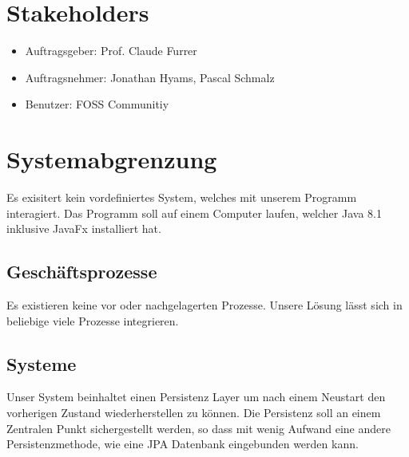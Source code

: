 \documentclass[11pt,titelpage]{scrartcl}
\begin{document}
\section{Stakeholders}
\begin{itemize}
\item{Auftragsgeber: Prof. Claude Furrer}
\item{Auftragsnehmer: Jonathan Hyams, Pascal Schmalz}
\item{Benutzer: FOSS Communitiy}
\end{itemize}
\section {Systemabgrenzung}
Es exisitert kein vordefiniertes System, welches mit unserem Programm interagiert.
Das Programm soll auf einem Computer laufen, welcher Java 8.1 inklusive JavaFx installiert hat.
 
\subsection{Geschäftsprozesse}
Es existieren keine vor\- oder nachgelagerten Prozesse. Unsere Lösung lässt sich in beliebige viele Prozesse integrieren.
\subsection{Systeme}
Unser System beinhaltet einen Persistenz Layer um nach einem Neustart den vorherigen Zustand wiederherstellen zu können.
Die Persistenz soll an einem Zentralen Punkt sichergestellt werden, so dass mit wenig Aufwand eine andere Persistenzmethode, wie eine JPA Datenbank eingebunden werden kann.
\end{document}
